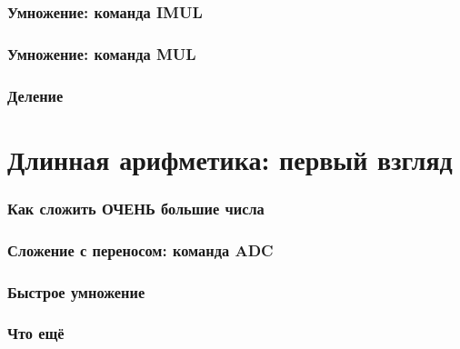 \documentclass[pdf,9pt,aspectratio=169]{beamer}
\begin{document}
\begin{frame}[fragile]\frametitle{Умножение: команда IMUL}
\end{frame}

\begin{frame}[fragile]\frametitle{Умножение: команда MUL}
\end{frame}

\begin{frame}[fragile]\frametitle{Деление}
\end{frame}

\section{Длинная арифметика: первый взгляд}

\begin{frame}[fragile]\frametitle{Как сложить ОЧЕНЬ большие числа}
\end{frame}

\begin{frame}[fragile]\frametitle{Сложение с переносом: команда ADC}
\end{frame}

\begin{frame}[fragile]\frametitle{Быстрое умножение}
\end{frame}

\begin{frame}[fragile]\frametitle{Что ещё}
\end{frame}
\end{document}
